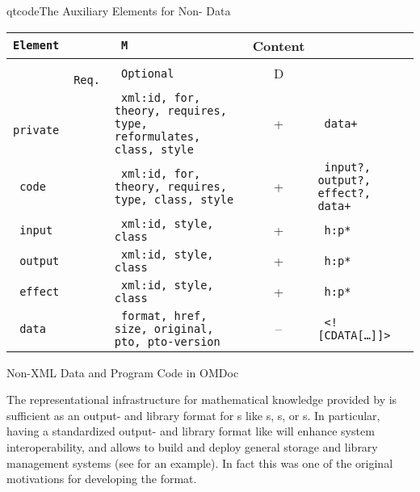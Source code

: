 \begin{module}[id=ext]
\begin{omgroup}[id=ext,short=Auxiliary Elements]
\begin{presonly}
\begin{myfig}{qtcode}{The {\omdoc} Auxiliary Elements for Non-{\xml} Data}
\begin{scriptsize}
\begin{tabular}{|>{\tt}l|>{\tt}l|>{\tt}p{}|c|>{\tt}p{}|}\hline
{\rm Element}& \multicolumn{2}{l|}{Attributes\hspace*{2.25cm}} & M & Content  \\\hline
             & {\rm Req.} & {\rm Optional}                     & D & \\\hline\hline
 private     &            & xml:id, for, theory, 
                               requires, type, reformulates, class, style
                                               & +  &  data+ \\\hline
 code        &            & xml:id, for, theory, 
                              requires, type, class, style
                              & +  & input?, output?, effect?, data+ \\\hline
 input       &            & xml:id, style, class   & + & h:p*\\\hline
 output      &            & xml:id, style, class   & + & h:p*\\\hline
 effect      &            & xml:id, style, class   & + & h:p*\\\hline
 data        &            & format, href, size, original, pto, pto-version 
                                               & -- & <![CDATA[\ldots]]> \\\hline
\end{tabular}
\end{scriptsize}
\end{myfig}
\end{presonly}

\begin{omgroup}[id=private]{Non-XML Data and Program Code in OMDoc}

The representational infrastructure for mathematical knowledge provided by {\omdoc} is
sufficient as an output- and library format for
{s} like {s},
{s}, or {s}. In particular,
having a standardized output- and library format like {\omdoc} will enhance system
interoperability, and allows to build and deploy general storage and library management
systems (see {} for an {\omdoc} example). In fact this was one of the
original motivations for developing the format.
  

\end{omgroup}
\end{omgroup}
\end{module}
